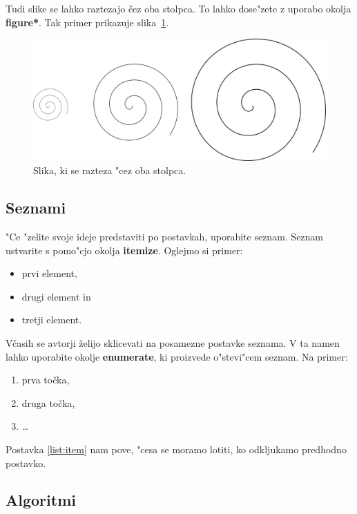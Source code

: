 \documentclass[sigconf]{acmart}
\begin{document}
Tudi slike se lahko raztezajo čez oba stolpca.  To lahko dose"zete z uporabo
okolja \textbf{figure*}.  Tak primer prikazuje slika~\ref{fig:spin}.

\begin{figure}
    \centering
    \includegraphics[scale=0.8]{spin.png}
    \caption{Slika, ki se razteza "cez oba stolpca.}
    \label{fig:spin}
\end{figure}

\subsection{Seznami}

"Ce "zelite svoje ideje predstaviti po postavkah, uporabite seznam.  Seznam
ustvarite s pomo"cjo okolja \textbf{itemize}.  Oglejmo si primer:

\begin{itemize}
    \item prvi element,
    \item drugi element in
    \item tretji element.
\end{itemize}

Včasih se avtorji želijo sklicevati na posamezne postavke seznama.  V ta namen
lahko uporabite okolje \textbf{enumerate}, ki proizvede o"stevi"cem seznam.
Na primer:

\begin{enumerate}
    \item prva točka,
    \item\label{list:item} druga točka,
    \item \ldots
\end{enumerate}

Postavka \ref{list:item} nam pove, "cesa se moramo lotiti, ko odkljukamo
predhodno postavko.

\subsection{Algoritmi}
\end{document}
